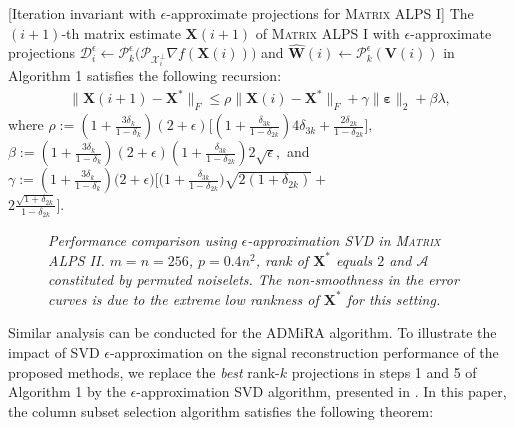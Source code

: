 \documentclass[twocolumn]{svjour3}
\newcommand{\vectornorm}[1]{\|#1\|}
\newcommand{\vectornormbig}[1]{\big\|#1\big\|}
\newcommand{\sensing}{\boldsymbol{\mathcal{A}}}
\newcommand{\signal}{\boldsymbol{X}}
\newcommand{\bestsignal}{\boldsymbol{X}^\ast}
\newcommand{\noise}{\boldsymbol{\varepsilon}}
\newcommand{\rank}{k}
\begin{document}
\begin{theorem}\label{thm:mALPS0_appr}[Iteration invariant with $ \epsilon $-approximate projections for \textsc{Matrix ALPS I}] The $(i+1)$-th matrix estimate $\signal(i+1)$ of \textsc{Matrix ALPS I} with $ \epsilon $-approximate projections $ \mathcal{D}_i^\epsilon \leftarrow \mathcal{P}_{\rank}^{\epsilon}\big( \mathcal{P}_{\mathcal{X}_i^{\bot}} \nabla f(\signal(i)) \big) $ and $ \widehat{\boldsymbol{W}}(i) \leftarrow \mathcal{P}_{\rank}^{\epsilon}(\boldsymbol{V}(i)) $ in Algorithm 1 satisfies the following recursion:
\begin{align}
\vectornormbig{\signal(i+1) - \bestsignal}_F \leq \rho\vectornormbig{\signal(i) - \bestsignal}_F 
+\gamma \vectornorm{\noise}_2 + \beta \lambda, \label{eq:mALPS0:thm_appr}
\end{align}
where $\rho:= \left(1 + \frac{3\delta_{\rank}}{1-\delta_{\rank}}\right)\left(2 + \epsilon\right)\big [ ( 1+ \frac{\delta_{3\rank}}{1-\delta_{2\rank}})4\delta_{3\rank} + \frac{2\delta_{2\rank}}{1-\delta_{2\rank}}\big], $ $\beta := \left(1 + \frac{3\delta_{\rank}}{1-\delta_{\rank}}\right)\left(2 + \epsilon\right)\left(1+ \frac{\delta_{3\rank}}{1-\delta_{2\rank}} \right)2\sqrt{\epsilon}, $ and \\ $
\gamma := \left(1 + \frac{3\delta_{\rank}}{1-\delta_{\rank}}\right)\big(2 + \epsilon\big)\Big[ \big(1+ \frac{\delta_{3\rank}}{1-\delta_{2\rank}}\big)\sqrt{2(1+\delta_{2\rank})} + $ \\ $ 2\frac{\sqrt{1+\delta_{2\rank}}}{1-\delta_{2\rank}}\Big]. $
\end{theorem}


\begin{figure}[!ht]
\centering
{}
\caption{\small\sl Performance comparison using $\epsilon$-approximation SVD \cite{deshpande2} in \textsc{Matrix ALPS II}. $m = n = 256$, $p = 0.4n^2$, rank of $\bestsignal$ equals $2$ and $\sensing $ constituted by permuted noiselets. The non-smoothness in the error curves is due to the extreme low rankness of $\bestsignal$ for this setting. } \label{fig: lambda1}
\end{figure}

Similar analysis can be conducted for the ADMiRA algorithm. To illustrate the impact of SVD $\epsilon$-approximation on the signal reconstruction performance of the proposed methods, we replace the {\it best} rank-$\rank$ projections in steps 1 and 5 of Algorithm 1 by the $\epsilon$-approximation SVD algorithm, presented in \cite{deshpande2}. In this paper, the column subset selection algorithm satisfies the following theorem:
\end{document}
